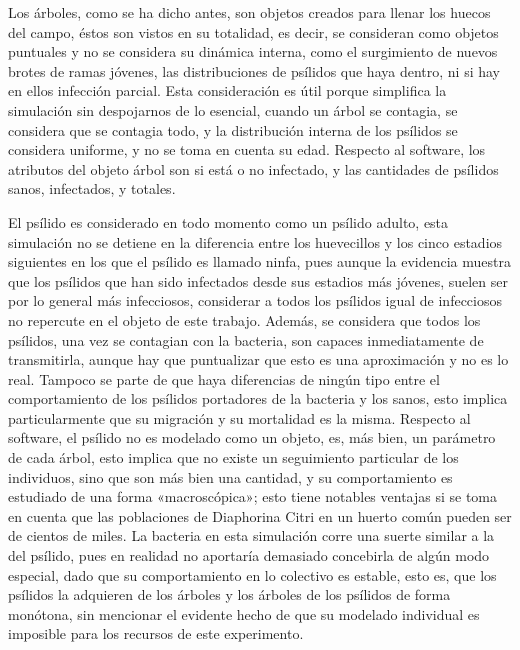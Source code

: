 Los árboles, como se ha dicho antes, son objetos creados para llenar los huecos del campo, éstos son vistos en su totalidad, es decir, se consideran como objetos puntuales y no se considera su dinámica interna, como el surgimiento de nuevos brotes de ramas jóvenes, las distribuciones de psílidos que haya dentro, ni si hay en ellos infección parcial. Esta consideración es útil porque simplifica la simulación sin despojarnos de lo esencial, cuando un árbol se contagia, se considera que se contagia todo, y la distribución interna de los psílidos se considera uniforme, y no se toma en cuenta su edad. Respecto al software, los atributos del objeto árbol son si está o no infectado, y las cantidades de psílidos sanos, infectados, y totales.

El psílido es considerado en todo momento como un psílido adulto, esta simulación no se detiene en la diferencia entre los huevecillos y los cinco estadios siguientes en los que el psílido es llamado ninfa, pues aunque la evidencia muestra que los psílidos que han sido infectados desde sus estadios más jóvenes, suelen ser por lo general más infecciosos, considerar a todos los psílidos igual de infecciosos no repercute en el objeto de este trabajo. Además, se considera que todos los psílidos, una vez se contagian con la bacteria, son capaces inmediatamente de transmitirla, aunque hay que puntualizar que esto es una aproximación y no es lo real. Tampoco se parte de que haya diferencias de ningún tipo entre el comportamiento de los psílidos portadores de la bacteria y los sanos, esto implica particularmente que su migración y su mortalidad es la misma. Respecto al software, el psílido no es modelado como un objeto, es, más bien, un parámetro de cada árbol, esto implica que no existe un seguimiento particular de los individuos, sino que son más bien una cantidad, y su comportamiento es estudiado de una forma «macroscópica»; esto tiene notables ventajas si se toma en cuenta que las poblaciones de Diaphorina Citri en un huerto común pueden ser de cientos de miles. La bacteria en esta simulación corre una suerte similar a la del psílido, pues en realidad no aportaría demasiado concebirla de algún modo especial, dado que su comportamiento en lo colectivo es estable, esto es, que los psílidos la adquieren de los árboles y los árboles de los psílidos de forma monótona, sin mencionar el evidente hecho de que su modelado individual es imposible para los recursos de este experimento.

